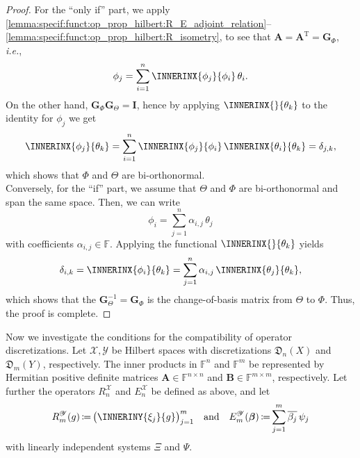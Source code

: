 \documentclass[a4paper]{paper}
\newcommand*{\SPC}[1]{{\ensuremath{\mathscr{#1}}}}
\newcommand*{\SPCX}{\SPC{X}}
\newcommand*{\SPCY}{\SPC{Y}}
\newcommand*{\FIELD}{{\ensuremath{\mathbb{F}}}}
\newcommand*{\Fn}{{\ensuremath{\FIELD^n}}}
\newcommand*{\Fm}{{\ensuremath{\FIELD^m}}}
\newcommand*{\Fnxn}{{\ensuremath{\FIELD^{n \times n}}}}
\newcommand*{\Fmxm}{{\ensuremath{\FIELD^{m \times m}}}}
\newcommand*{\EXT}[2]{\ensuremath{E_{#1}^{#2}}}
\newcommand*{\REST}[2]{\ensuremath{R_{#1}^{#2}}}
\newcommand*{\RnX}{{\ensuremath{\REST{n}{\SPC{X}}}}}
\newcommand*{\RmY}{{\ensuremath{\REST{m}{\SPC{Y}}}}}
\newcommand*{\EnX}{{\ensuremath{\EXT{n}{\SPC{X}}}}}
\newcommand*{\EmY}{{\ensuremath{\EXT{m}{\SPC{Y}}}}}
\newcommand*{\DISCR}[2]{{\ensuremath{\mathfrak{D}_{#1}(#2)}}}
\newcommand*{\DISCRnX}{\DISCR{n}{X}}
\newcommand*{\DISCRmY}{\DISCR{m}{Y}}
\DeclareMathOperator{\DEFEQ}{{\coloneqq}}
\newcommand*{\CCONJ}[1]{{\ensuremath{\overline{#1}}}}
\newcommand*{\TRANSP}[1]{{\ensuremath{#1^{\mathrm{T}}}}}
\newcommand*{\ie}{\textsl{i.e.}\xspace}
\newcommand*{\BDbeta}{\boldsymbol{\beta}}
\newcommand*{\BDA}{\boldsymbol{A}}
\newcommand*{\BDB}{\boldsymbol{B}}
\newcommand*{\BDG}{\boldsymbol{G}}
\newcommand*{\BDI}{\boldsymbol{I}}
\begin{document}
\begin{proof}
 For the ``only if'' part, we apply 
 \eqref{lemma:specif:funct:op_prop_hilbert:R_E_adjoint_relation}--\eqref{lemma:specif:funct:op_prop_hilbert:R_isometry},
 to see that $\BDA = \TRANSP{\BDA} = \BDG_\Phi$, \ie,
 \begin{equation*}
  \phi_j = \sum_{i=1}^n \INNERINX{\phi_j}{\phi_i}\, \theta_i.
 \end{equation*}
 On the other hand, $\BDG_\Phi \BDG_\Theta = \BDI$, hence by applying $\INNERINX{}{\theta_k}$ to the identity 
 for $\phi_j$ we get
 \begin{equation*}
  \INNERINX{\phi_j}{\theta_k} 
  = \sum_{i=1}^n \INNERINX{\phi_j}{\phi_i}\, \INNERINX{\theta_i}{\theta_k} = \delta_{j,k},
 \end{equation*}
 which shows that $\Phi$ and $\Theta$ are bi-orthonormal.\\
 Conversely, for the ``if'' part, we assume that $\Theta$ and $\Phi$ are bi-orthonormal and span the same space. Then, 
 we can write
 \begin{equation*}
  \phi_i = \sum_{j=1}^n \alpha_{i,j}\, \theta_j
 \end{equation*}
 with coefficients $\alpha_{i,j} \in \FIELD$. Applying the functional $\INNERINX{}{\theta_k}$ yields
 \begin{equation*}
  \delta_{i,k} = \INNERINX{\phi_i}{\theta_k} = \sum_{j=1}^n \alpha_{i,j}\, 
\INNERINX{\theta_j}{\theta_k},
 \end{equation*}
 which shows that the $\BDG_\Theta^{-1} = \BDG_\Phi$ is the change-of-basis matrix from $\Theta$ to $\Phi$. Thus, the
 proof is complete.
\end{proof}


Now we investigate the conditions for the compatibility of operator discretizations. Let $\SPCX, \SPCY$ be Hilbert 
spaces with discretizations $\DISCRnX$ and $\DISCRmY$, respectively. The inner products in 
$\Fn$ and $\Fm$ be represented by Hermitian positive definite matrices $\BDA \in \Fnxn$ and $\BDB 
\in \Fmxm$, respectively. 
Let further the operators $\RnX$ and $\EnX$ be defined as above, and let
%
\begin{equation*}
 \RmY(g) \DEFEQ  \big( \INNERINY{\xi_j}{g} \big)_{j=1}^m
 \quad \text{and} \quad
 \EmY(\BDbeta) \DEFEQ  \sum_{j=1}^m \CCONJ{\beta_j}\, \psi_j
\end{equation*}
%
with linearly independent systems $\Xi$ and $\Psi$.
\end{document}
